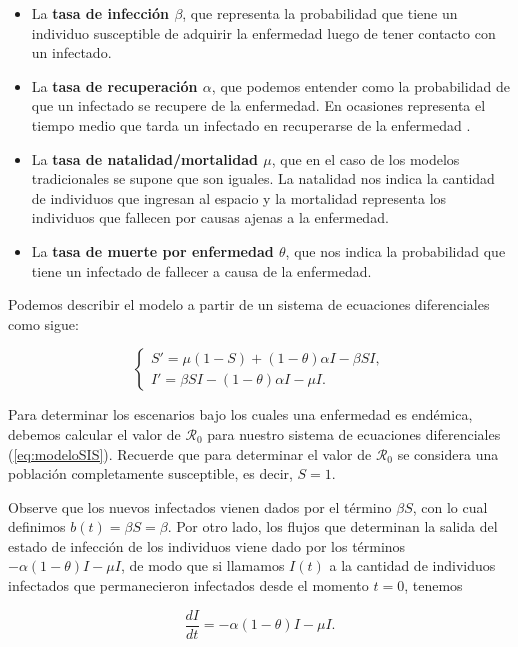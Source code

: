 \begin{itemize}
    \item La \textbf{tasa de infección $\beta$}, que representa la probabilidad que tiene un individuo susceptible de adquirir la enfermedad luego de tener contacto con un infectado.
    \item La \textbf{tasa de recuperación $\alpha$}, que podemos entender como la probabilidad de que un infectado se recupere de la enfermedad. En ocasiones representa el tiempo medio que tarda un infectado en recuperarse de la enfermedad \cite{diego2010}.
    \item La \textbf{tasa de natalidad/mortalidad $\mu$}, que en el caso de los modelos tradicionales se supone que son iguales. La natalidad nos indica la cantidad de individuos que ingresan al espacio y la mortalidad representa los individuos que fallecen por causas ajenas a la enfermedad.
    \item La \textbf{tasa de muerte por enfermedad $\theta$}, que nos indica la probabilidad que tiene un infectado de fallecer a causa de la enfermedad.
\end{itemize}

Podemos describir el modelo a partir de un sistema de ecuaciones diferenciales como sigue:

\begin{equation}\label{eq:modeloSIS}
\left\{
\begin{array}{l}
S' = \mu(1 - S) + (1 - \theta)\alpha I - \beta S I, \\
I' = \beta S I - (1 - \theta)\alpha I - \mu I.
\end{array}
\right.
\end{equation}

Para determinar los escenarios bajo los cuales una enfermedad es endémica, debemos calcular el valor de $\mathcal{R}_0$ para nuestro sistema de ecuaciones diferenciales (\ref{eq:modeloSIS}). Recuerde que para determinar el valor de $\mathcal{R}_0$ se considera una población completamente susceptible, es decir, $S=1$.

Observe que los nuevos infectados vienen dados por el término $\beta S$, con lo cual definimos $b(t) = \beta S = \beta$. Por otro lado, los flujos que determinan la salida del estado de infección de los individuos viene dado por los términos $-\alpha(1-\theta)I-\mu I$, de modo que si llamamos $I(t)$ a la cantidad de individuos infectados que permanecieron infectados desde el momento $t=0$, tenemos

\begin{equation}\label{eq:Cambio en I}
\frac{dI}{dt} = -\alpha(1-\theta)I-\mu I.
\end{equation}

